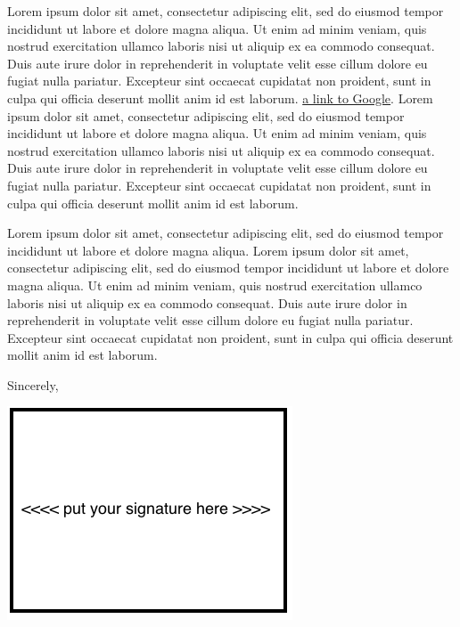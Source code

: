 \documentclass[12pt,sigleft,dateno,stdletter]{newlfm}
\begin{document}
\begin{newlfm}

Lorem ipsum dolor sit amet, consectetur adipiscing elit, sed do eiusmod tempor incididunt ut labore et dolore magna aliqua.
Ut enim ad minim veniam, quis nostrud exercitation ullamco laboris nisi ut aliquip ex ea commodo consequat. 
Duis aute irure dolor in reprehenderit in voluptate velit esse cillum dolore eu fugiat nulla pariatur. 
Excepteur sint occaecat cupidatat non proident, sunt in culpa qui officia deserunt mollit anim id est laborum. 
\href{https://www.google.com/}{a link to Google}. 
Lorem ipsum dolor sit amet, consectetur adipiscing elit, sed do eiusmod tempor incididunt ut labore et dolore magna aliqua.
Ut enim ad minim veniam, quis nostrud exercitation ullamco laboris nisi ut aliquip ex ea commodo consequat. 
Duis aute irure dolor in reprehenderit in voluptate velit esse cillum dolore eu fugiat nulla pariatur. 
Excepteur sint occaecat cupidatat non proident, sunt in culpa qui officia deserunt mollit anim id est laborum. 

Lorem ipsum dolor sit amet, consectetur adipiscing elit, sed do eiusmod tempor incididunt ut labore et dolore magna aliqua.
Lorem ipsum dolor sit amet, consectetur adipiscing elit, sed do eiusmod tempor incididunt ut labore et dolore magna aliqua.
Ut enim ad minim veniam, quis nostrud exercitation ullamco laboris nisi ut aliquip ex ea commodo consequat. 
Duis aute irure dolor in reprehenderit in voluptate velit esse cillum dolore eu fugiat nulla pariatur. 
Excepteur sint occaecat cupidatat non proident, sunt in culpa qui officia deserunt mollit anim id est laborum. \\
\par

Sincerely,\par
\includegraphics[scale=0.6,ext=.png]{YourSignatureHere}
\end{newlfm}
\end{document}
